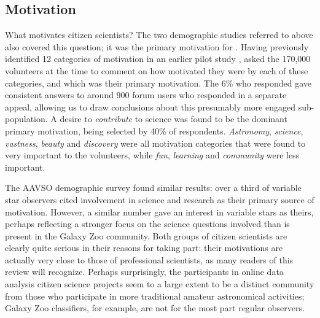 \documentclass{ar2e}
\begin{document}

\subsection{Motivation}
\label{sec:crowd:motivation}


What motivates citizen scientists? The two demographic studies referred to
above also covered this question; it was the primary motivation for
\citeauthor{Rad++2013}. Having previously identified 12 categories of
motivation in an earlier pilot study \citep{Rad++2010}, \citeauthor{Rad++2013}
asked the 170,000 volunteers at the time to comment on how motivated they were
by each of these categories, and which was their primary motivation. The 6\%
who responded gave consistent answers to around 900 forum users who responded
in a separate appeal, allowing us to draw conclusions about this presumably
more engaged sub-population. A desire to {\it contribute} to science was found
to be the dominant primary motivation, being selected by 40\% of respondents.
{\it Astronomy}, {\it science}, {\it vastness}, {\it beauty} and 
{\it discovery} were all motivation categories that were found to very
important to the volunteers, while {\it fun}, {\it learning} and {\it
community} were less important. 

The AAVSO demographic survey \citep{P+P2012} found similar results: over a third
of variable star observers cited involvement in science and research as their
primary source of motivation. However, a similar number gave an interest in
variable stars as theirs, perhaps reflecting a stronger focus on the science
questions involved than is present in the Galaxy Zoo community. Both groups of
citizen scientists are clearly quite serious in their reasons for taking part:
their motivations are actually very close to those of professional scientists,
as many readers of this review will recognize. Perhaps surprisingly, the
participants in online data analysis citizen science projects seem to a large
extent to be a distinct community from those who participate in more traditional
amateur astronomical activities; Galaxy Zoo classifiers, for example, are not
for the most part regular observers. 
\end{document}

